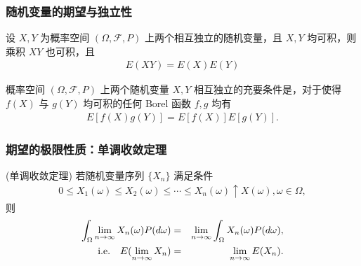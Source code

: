 \documentclass[Prob-All.tex]{subfiles}
\begin{document}
\begin{frame}
		\frametitle{随机变量的期望与独立性}
		\begin{thm}
			设 $X, Y$ 为概率空间 $(\Omega,\mathcal{F}, P)$ 上两个相互独立的随机变量，且 $X, Y$ 均可积，则乘积 $XY$ 也可积，且
			\begin{eqnarray*}
				E(XY)=E(X)E(Y)
			\end{eqnarray*}

		\end{thm}

		\pause
		\begin{thm}
			概率空间 $(\Omega,\mathcal{F}, P)$ 上两个随机变量 $X, Y$ 相互独立的充要条件是，对于使得 $f (X)$ 与 $g (Y)$ 均可积的任何 Borel 函数 $f,g$ 均有
			\begin{eqnarray*}
				E[f(X)g(Y)]=E[f(X)]E[g(Y)].
			\end{eqnarray*}

		\end{thm}



	\end{frame}




	\begin{frame}
		\frametitle{期望的极限性质：单调收敛定理}
		\begin{thm}
			(单调收敛定理) 若随机变量序列 $\{X_n\}$ 满足条件
			\begin{eqnarray*}
				0\leq X_1(\omega)\leq X_2(\omega)\leq \cdots \leq X_n(\omega)\uparrow X(\omega), \omega\in \Omega,
			\end{eqnarray*}
			则
			\begin{eqnarray*}
				\int_{\Omega}\lim_{n\rightarrow\infty}X_n(\omega)P(d\omega)&=& \lim_{n\rightarrow\infty}\int_\Omega X_n(\omega)P(d\omega), \\
				{\rm i.e.} \quad    E(\lim_{n\rightarrow\infty}X_n)&=&\lim_{n\rightarrow\infty}E(X_n).
			\end{eqnarray*}

		\end{thm}

	\end{frame}
\end{document}
